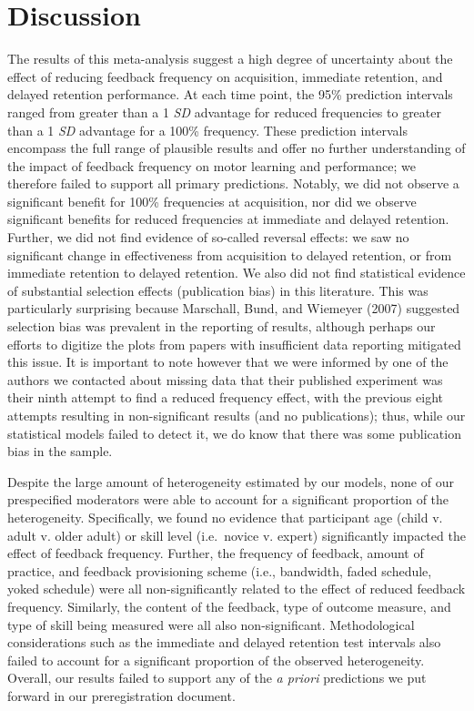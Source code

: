 \documentclass[
  english,
  man,mask,floatsintext]{apa7}
\begin{document}
\hypertarget{discussion}{%
\section{Discussion}\label{discussion}}

The results of this meta-analysis suggest a high degree of uncertainty about the effect of reducing feedback frequency on acquisition, immediate retention, and delayed retention performance. At each time point, the 95\% prediction intervals ranged from greater than a 1 \emph{SD} advantage for reduced frequencies to greater than a 1 \emph{SD} advantage for a 100\% frequency. These prediction intervals encompass the full range of plausible results and offer no further understanding of the impact of feedback frequency on motor learning and performance; we therefore failed to support all primary predictions. Notably, we did not observe a significant benefit for 100\% frequencies at acquisition, nor did we observe significant benefits for reduced frequencies at immediate and delayed retention. Further, we did not find evidence of so-called reversal effects: we saw no significant change in effectiveness from acquisition to delayed retention, or from immediate retention to delayed retention. We also did not find statistical evidence of substantial selection effects (publication bias) in this literature. This was particularly surprising because Marschall, Bund, and Wiemeyer (2007) suggested selection bias was prevalent in the reporting of results, although perhaps our efforts to digitize the plots from papers with insufficient data reporting mitigated this issue. It is important to note however that we were informed by one of the authors we contacted about missing data that their published experiment was their ninth attempt to find a reduced frequency effect, with the previous eight attempts resulting in non-significant results (and no publications); thus, while our statistical models failed to detect it, we do know that there was some publication bias in the sample.

Despite the large amount of heterogeneity estimated by our models, none of our prespecified moderators were able to account for a significant proportion of the heterogeneity. Specifically, we found no evidence that participant age (child v. adult v. older adult) or skill level (i.e.~novice v. expert) significantly impacted the effect of feedback frequency. Further, the frequency of feedback, amount of practice, and feedback provisioning scheme (i.e., bandwidth, faded schedule, yoked schedule) were all non-significantly related to the effect of reduced feedback frequency. Similarly, the content of the feedback, type of outcome measure, and type of skill being measured were all also non-significant. Methodological considerations such as the immediate and delayed retention test intervals also failed to account for a significant proportion of the observed heterogeneity. Overall, our results failed to support any of the \emph{a priori} predictions we put forward in our preregistration document.
\end{document}
